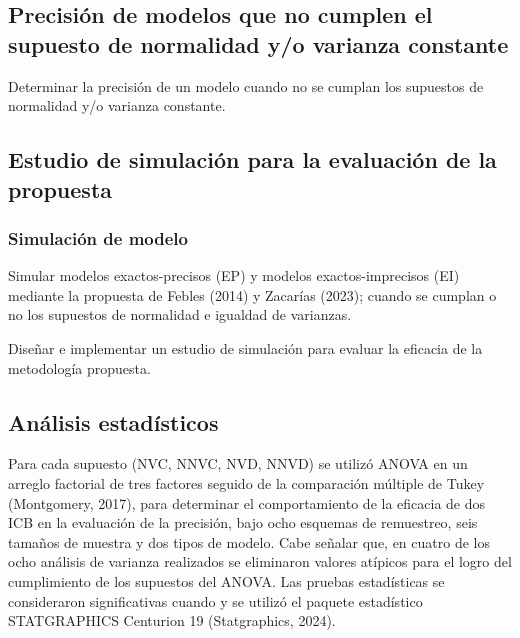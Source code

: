 \subsection{Precisión de modelos que no cumplen el supuesto de normalidad y/o varianza constante}
Determinar la precisión de un modelo cuando no se cumplan los supuestos de normalidad y/o varianza constante.
\vspace{1.5cm}
	 
	 
\subsection{Estudio de simulación para la evaluación de la propuesta}
\vspace{1.5cm}

\subsubsection{Simulación de modelo}
Simular modelos exactos-precisos (EP) y modelos exactos-imprecisos (EI) mediante la propuesta de Febles (2014) y Zacarías (2023); cuando se cumplan o no los supuestos de normalidad e igualdad de varianzas.

Diseñar e implementar un estudio de simulación para evaluar la eficacia de la metodología propuesta.
	 \vspace{1.5cm}
	 	 
	 	 
	 	 
	 	 
\subsection{Análisis estadísticos}
Para cada supuesto (NVC, NNVC, NVD, NNVD) se utilizó ANOVA en un arreglo factorial de tres factores seguido de la comparación múltiple de Tukey (Montgomery, 2017), para determinar el comportamiento de la eficacia de dos ICB en la evaluación de la precisión, bajo ocho esquemas de remuestreo, seis tamaños de muestra y dos tipos de modelo. Cabe señalar que, en cuatro de los ocho análisis de varianza realizados se eliminaron valores atípicos para el logro del cumplimiento de los supuestos del ANOVA.
Las pruebas estadísticas se consideraron significativas cuando  y se utilizó el paquete estadístico STATGRAPHICS Centurion 19 (Statgraphics, 2024).




